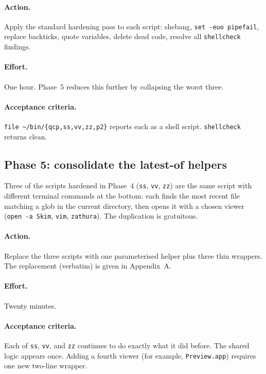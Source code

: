\documentclass[11pt,letterpaper]{scrartcl}
\begin{document}
\paragraph{Action.} Apply the standard hardening pass to each
script: shebang, \texttt{set -euo pipefail}, replace backticks,
quote variables, delete dead code, resolve all
\texttt{shellcheck} findings.

\paragraph{Effort.} One hour. Phase~5 reduces this further by
collapsing the worst three.

\paragraph{Acceptance criteria.}
\texttt{file \textasciitilde/bin/\{qcp,ss,vv,zz,p2\}} reports each
as a shell script. \texttt{shellcheck} returns clean.

\subsection{Phase 5: consolidate the latest-of helpers}

Three of the scripts hardened in Phase~4 (\texttt{ss},
\texttt{vv}, \texttt{zz}) are the same script with different
terminal commands at the bottom: each finds the most recent file
matching a glob in the current directory, then opens it with a
chosen viewer (\texttt{open -a Skim}, \texttt{vim},
\texttt{zathura}). The duplication is gratuitous.

\paragraph{Action.} Replace the three scripts with one
parameterised helper plus three thin wrappers. The replacement
(verbatim) is given in Appendix~A.

\paragraph{Effort.} Twenty minutes.

\paragraph{Acceptance criteria.} Each of \texttt{ss}, \texttt{vv},
and \texttt{zz} continues to do exactly what it did before. The
shared logic appears once. Adding a fourth viewer (for example,
\texttt{Preview.app}) requires one new two-line wrapper.
\end{document}
